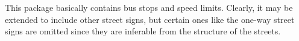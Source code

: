 This package basically contains bus stops and speed limits.
Clearly, it may be extended to include other street signs, but certain ones like
the one-way street signs are omitted since they are inferable from the
structure of the streets.

